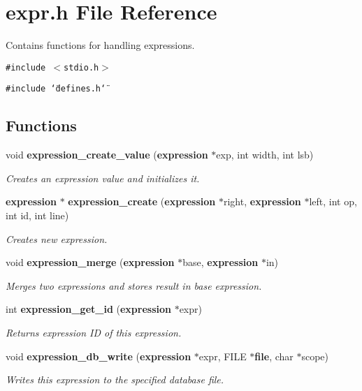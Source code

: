 \section{expr.h File Reference}
\label{expr_8h}
Contains functions for handling expressions. 


{\tt \#include $<$stdio.h$>$}\par
{\tt \#include \char`\"{}defines.h\char`\"{}}\par
\subsection*{Functions}
\begin{CompactItemize}
\item 
void {\bf expression\_\-create\_\-value} ({\bf expression} $\ast$exp, int width, int lsb)
\begin{CompactList}\small\item\em Creates an expression value and initializes it.\item\end{CompactList}\item 
{\bf expression} $\ast$ {\bf expression\_\-create} ({\bf expression} $\ast$right, {\bf expression} $\ast$left, int op, int id, int line)
\begin{CompactList}\small\item\em Creates new expression.\item\end{CompactList}\item 
void {\bf expression\_\-merge} ({\bf expression} $\ast$base, {\bf expression} $\ast$in)
\begin{CompactList}\small\item\em Merges two expressions and stores result in base expression.\item\end{CompactList}\item 
int {\bf expression\_\-get\_\-id} ({\bf expression} $\ast$expr)
\begin{CompactList}\small\item\em Returns expression ID of this expression.\item\end{CompactList}\item 
void {\bf expression\_\-db\_\-write} ({\bf expression} $\ast$expr, FILE $\ast${\bf file}, char $\ast$scope)
\begin{CompactList}\small\item\em Writes this expression to the specified database file.\item\end{CompactList}\item 

\end{CompactItemize}
